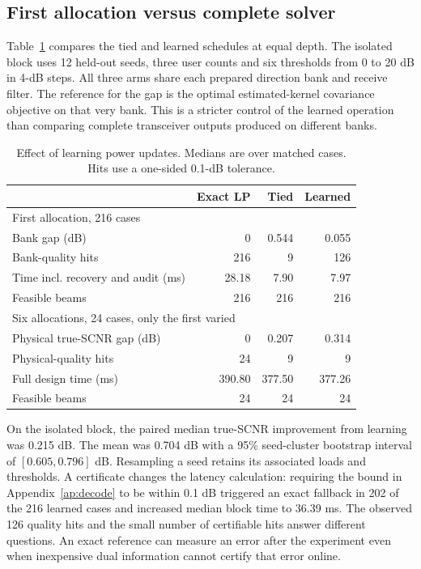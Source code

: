 \subsection{First allocation versus complete solver}
Table~\ref{tab:pd} compares the tied and learned schedules at equal depth. The isolated block uses 12 held-out seeds, three user counts and six thresholds from 0 to 20 dB in 4-dB steps. All three arms share each prepared direction bank and receive filter. The reference for the gap is the optimal estimated-kernel covariance objective on that very bank. This is a stricter control of the learned operation than comparing complete transceiver outputs produced on different banks.
\begin{table}[t]\centering\footnotesize
\caption{Effect of learning power updates. Medians are over matched cases. Hits use a one-sided 0.1-dB tolerance.}\label{tab:pd}
\setlength{\tabcolsep}{4pt}\begin{tabular}{@{}lrrr@{}}\toprule
& Exact LP & Tied & Learned\\\midrule
\multicolumn{4}{l}{First allocation, 216 cases}\\
Bank gap (dB) & 0 & 0.544 & 0.055\\
Bank-quality hits &216&9&126\\
Time incl. recovery and audit (ms)&28.18&7.90&7.97\\
Feasible beams&216&216&216\\\midrule
\multicolumn{4}{l}{Six allocations, 24 cases, only the first varied}\\
Physical true-SCNR gap (dB)&0&0.207&0.314\\
Physical-quality hits&24&9&9\\
Full design time (ms)&390.80&377.50&377.26\\
Feasible beams&24&24&24\\\bottomrule
\end{tabular}\end{table}

On the isolated block, the paired median true-SCNR improvement from learning was 0.215 dB. The mean was 0.704 dB with a 95\% seed-cluster bootstrap interval of $[0.605,0.796]$ dB. Resampling a seed retains its associated loads and thresholds. A certificate changes the latency calculation: requiring the bound in Appendix~\ref{ap:decode} to be within 0.1 dB triggered an exact fallback in 202 of the 216 learned cases and increased median block time to 36.39 ms. The observed 126 quality hits and the small number of certifiable hits answer different questions. An exact reference can measure an error after the experiment even when inexpensive dual information cannot certify that error online.

